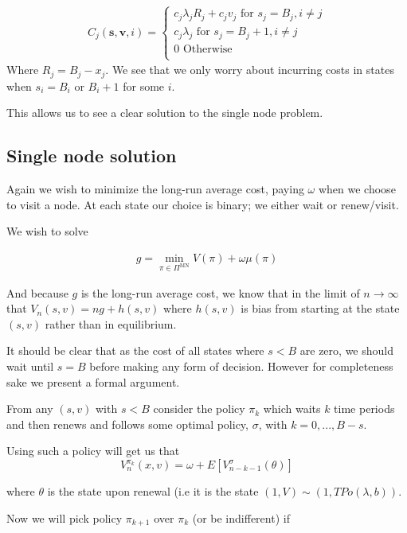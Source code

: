 \documentclass[a4paper,10pt]{article}
\theoremstyle{definition}
\theoremstyle{definition}
\theoremstyle{remark}
\theoremstyle{definition}
\begin{document}
\begin{align*}
C_{j}(\bm{s},\bm{v},i)=\begin{cases}
c_{j} \lambda_{j} R_{j} + c_{j} v_{j}  \text{ for } s_{j}=B_{j},i \neq j \\ 
c_{j} \lambda_{j} \text{ for } s_{j}=B_{j}+1,i \neq j  \\
0 \text{ Otherwise} \\
\end{cases}
\end{align*}
Where $R_{j}=B_{j}-x_{j}$. We see that we only worry about incurring costs in states when $s_{i}=B_{i}$ or $B_{i}+1$ for some $i$.

This allows us to see a clear solution to the single node problem.

\subsection{Single node solution}
\label{Section:Single node solution}
Again we wish to minimize the long-run average cost, paying $\omega$ when we choose to visit a node. At each state our choice is binary; we either wait or renew/visit.

We wish to solve

\begin{align*}
g=\min\limits_{\pi \in \Pi^{\text{MN}}} V(\pi)+\omega \mu(\pi)
\end{align*}

And because $g$ is the long-run average cost, we know that in the limit of $n \rightarrow \infty$ that $V_{n}(s,v)=ng + h(s,v)$ where $h(s,v)$ is bias from starting at the state $(s,v)$ rather than in equilibrium.

It should be clear that as the cost of all states where $s<B$ are zero, we should wait until $s=B$ before making any form of decision. However for completeness sake we present a formal argument.

From any $(s,v)$ with $s<B$ consider the policy $\pi_{k}$ which waits $k$ time periods and then renews and follows some optimal policy, $\sigma$, with $k=0,...,B-s$.

Using such a policy will get us that
\begin{equation}
V_{n}^{\pi_{k}}(x,v)=\omega + E[V_{n-k-1}^{\sigma}(\theta)]
\end{equation}

where $\theta$ is the state upon renewal (i.e it is the state $(1,V) \sim (1,TPo(\lambda,b))$.

Now we will pick policy $\pi_{k+1}$ over $\pi_{k}$ (or be indifferent) if
\end{document}
